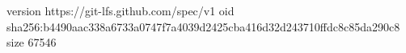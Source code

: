 version https://git-lfs.github.com/spec/v1
oid sha256:b4490aac338a6733a0747f7a4039d2425cba416d32d243710ffdc8c85da290c8
size 67546

